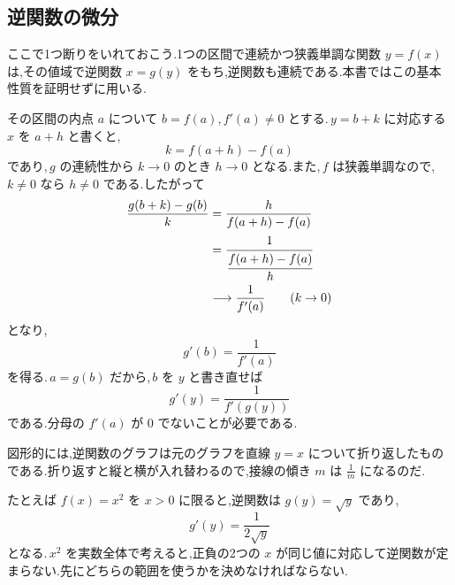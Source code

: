 \subsection{逆関数の微分}
ここで1つ断りをいれておこう.1つの区間で連続かつ狭義単調な関数 $y=f(x)$ は,その値域で逆関数 $x=g(y)$ をもち,逆関数も連続である.本書ではこの基本性質を証明せずに用いる.

その区間の内点 $a$ について $b=f(a)$,\,$f'(a)\ne0$ とする.\,$y=b+k$ に対応する $x$ を $a+h$ と書くと,
\[
 k=f(a+h)-f(a)
\]
であり,\,$g$ の連続性から $k\to0$ のとき $h\to0$ となる.また,\,$f$ は狭義単調なので,\,$k\ne0$ なら $h\ne0$ である.したがって
\begin{align*}
 \frac{g(b+k)-g(b)}k
 &=\frac{h}{f(a+h)-f(a)}\\
 &=\cfrac{1}{\cfrac{f(a+h)-f(a)}h}\\
 &\longrightarrow\frac1{f'(a)}\qquad(k\to0)
\end{align*}
となり,
\[
 g'(b)=\frac1{f'(a)}
\]
を得る.\,$a=g(b)$ だから,\,$b$ を $y$ と書き直せば
\[
 g'(y)=\frac1{f'(g(y))}
\]
である.分母の $f'(a)$ が $0$ でないことが必要である.

図形的には,逆関数のグラフは元のグラフを直線 $y=x$ について折り返したものである.折り返すと縦と横が入れ替わるので,接線の傾き $m$ は $\frac1m$ になるのだ.

たとえば $f(x)=x^2$ を $x>0$ に限ると,逆関数は $g(y)=\sqrt y$ であり,
\[
 g'(y)=\frac1{2\sqrt y}
\]
となる.\,$x^2$ を実数全体で考えると,正負の2つの $x$ が同じ値に対応して逆関数が定まらない.先にどちらの範囲を使うかを決めなければならない.
